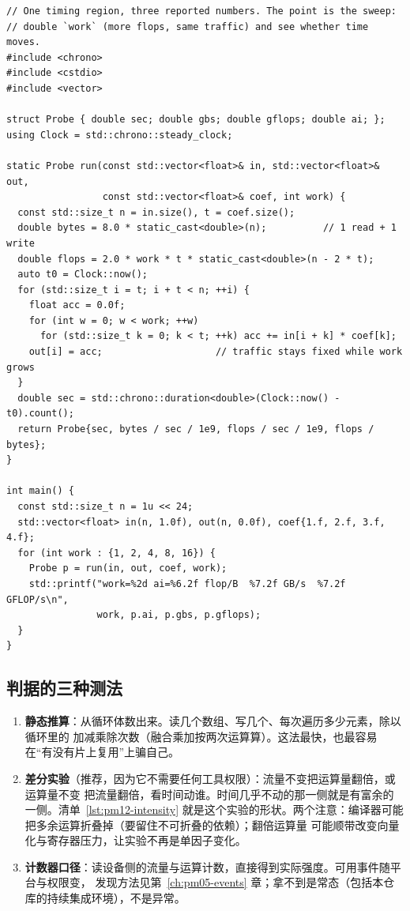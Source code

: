 \documentclass[12pt,a4paper,fontset=fandol]{ctexbook}
\begin{document}
\begin{lstlisting}[style=cppstyle,caption={同一段计时同时报出带宽、算力与算术强度；靠改变 work 做差分，看时间听谁的},label={lst:pm12-intensity}]
// One timing region, three reported numbers. The point is the sweep:
// double `work` (more flops, same traffic) and see whether time moves.
#include <chrono>
#include <cstdio>
#include <vector>

struct Probe { double sec; double gbs; double gflops; double ai; };
using Clock = std::chrono::steady_clock;

static Probe run(const std::vector<float>& in, std::vector<float>& out,
                 const std::vector<float>& coef, int work) {
  const std::size_t n = in.size(), t = coef.size();
  double bytes = 8.0 * static_cast<double>(n);          // 1 read + 1 write
  double flops = 2.0 * work * t * static_cast<double>(n - 2 * t);
  auto t0 = Clock::now();
  for (std::size_t i = t; i + t < n; ++i) {
    float acc = 0.0f;
    for (int w = 0; w < work; ++w)
      for (std::size_t k = 0; k < t; ++k) acc += in[i + k] * coef[k];
    out[i] = acc;                    // traffic stays fixed while work grows
  }
  double sec = std::chrono::duration<double>(Clock::now() - t0).count();
  return Probe{sec, bytes / sec / 1e9, flops / sec / 1e9, flops / bytes};
}

int main() {
  const std::size_t n = 1u << 24;
  std::vector<float> in(n, 1.0f), out(n, 0.0f), coef{1.f, 2.f, 3.f, 4.f};
  for (int work : {1, 2, 4, 8, 16}) {
    Probe p = run(in, out, coef, work);
    std::printf("work=%2d ai=%6.2f flop/B  %7.2f GB/s  %7.2f GFLOP/s\n",
                work, p.ai, p.gbs, p.gflops);
  }
}
\end{lstlisting}

\subsection*{判据的三种测法}
\begin{enumerate}
\item \textbf{静态推算}：从循环体数出来。读几个数组、写几个、每次遍历多少元素，除以循环里的
  加减乘除次数（融合乘加按两次运算算）。这法最快，也最容易在``有没有片上复用''上骗自己。
\item \textbf{差分实验}（推荐，因为它不需要任何工具权限）：流量不变把运算量翻倍，或运算量不变
  把流量翻倍，看时间动谁。时间几乎不动的那一侧就是有富余的一侧。清单~\ref{lst:pm12-intensity}
  就是这个实验的形状。两个注意：编译器可能把多余运算折叠掉（要留住不可折叠的依赖）；翻倍运算量
  可能顺带改变向量化与寄存器压力，让实验不再是单因子变化。
\item \textbf{计数器口径}：读设备侧的流量与运算计数，直接得到实际强度。可用事件随平台与权限变，
  发现方法见第~\ref{ch:pm05-events} 章；拿不到是常态（包括本仓库的持续集成环境），不是异常。
\end{enumerate}
\end{document}
